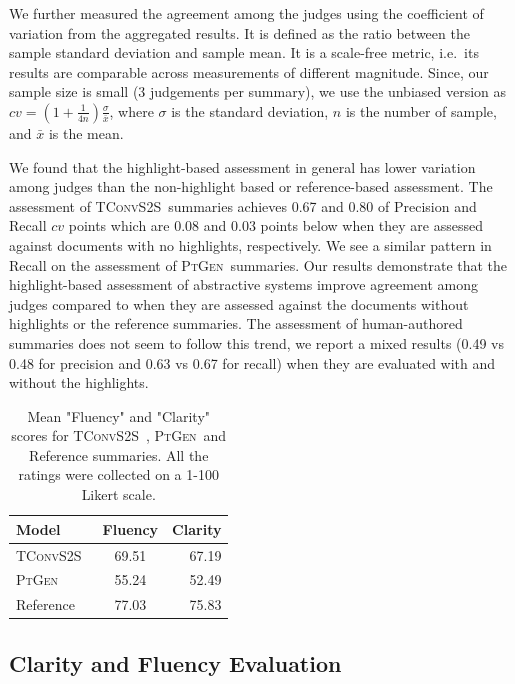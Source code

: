 \documentclass[11pt,a4paper]{article}
\newcommand\ptgen{\textsc{PtGen}}
\newcommand\tconv{\textsc{TConvS2S}}
\begin{document}
We further measured the agreement among the judges using the coefficient of variation \citep{everitt2006cambridge} from the aggregated results. It is defined as the ratio between the sample standard deviation and sample mean. It is a scale-free metric, i.e.\ its results are comparable across measurements of different magnitude. Since, our sample size is  small (3 judgements per summary), we  use the unbiased version \citep{sokal1995biometry} as $cv = (1 + \frac{1}{4n})\frac{\sigma}{\bar{x}}$, where $\sigma$ is the standard deviation, $n$ is the number of sample, and $\bar{x}$ is the mean.

We found that the highlight-based assessment in general has lower variation among judges than the non-highlight based or reference-based assessment. The assessment of \tconv\ summaries achieves 0.67 and 0.80 of Precision and Recall $cv$ points which are 0.08 and 0.03 points below when they are assessed against documents with no highlights, respectively. We see a similar pattern in Recall on the assessment of \ptgen\ summaries. Our results demonstrate that the highlight-based assessment of abstractive systems improve agreement among judges compared to when they are assessed against the documents without highlights or the reference summaries. The assessment of human-authored summaries does not seem to follow this trend, we report a mixed results (0.49 vs 0.48 for precision and 0.63 vs 0.67 for recall) when they are evaluated with and without the highlights.

\begin{table}[t!]
\small
\centering
\begin{tabular}{l | cr}
\hline
\textbf{Model} & \textbf{Fluency} & \textbf{Clarity} \\
\hline
\tconv\  & 69.51        & 67.19        \\
\ptgen\      & 55.24        & 52.49        \\
Reference      & 77.03        & 75.83       \\
\hline
\end{tabular}
\caption{Mean "Fluency" and "Clarity" scores for \tconv\ , \ptgen\   and Reference summaries. All the ratings were collected on a 1-100 Likert scale.}
\label{table:fluencyclarityresult}
\end{table}

\subsection{Clarity and Fluency Evaluation} 
\end{document}
